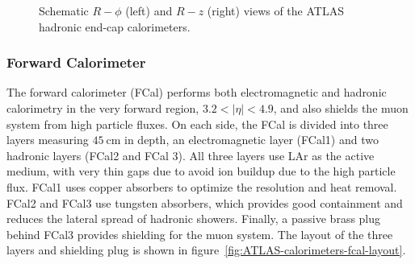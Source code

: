 \begin{figure}[htbp]
	\centering
	\caption{Schematic $R-\phi$ (left) and $R-z$ (right) views of the ATLAS hadronic end-cap calorimeters.}
	\label{fig:ATLAS-calorimeters-HEC-layout}
\end{figure}


\subsubsection{Forward Calorimeter}\label{sec:ATLAS-calorimeters-fcal}
The forward calorimeter (FCal) performs both electromagnetic and hadronic calorimetry in the very forward region, $3.2<|\eta|<4.9$, and also shields the muon system from high particle fluxes. On each side, the FCal is divided into three layers measuring $\SI{45}{\centi\meter}$ in depth, an electromagnetic layer (FCal1) and two hadronic layers (FCal2 and FCal 3). All three layers use LAr as the active medium, with very thin gaps due to avoid ion buildup due to the high particle flux. FCal1 uses copper absorbers to optimize the resolution and heat removal. FCal2 and FCal3 use tungsten absorbers, which provides good containment and reduces the lateral spread of hadronic showers. Finally, a passive brass plug behind FCal3 provides shielding for the muon system. The layout of the three layers and shielding plug is shown in figure~\ref{fig:ATLAS-calorimeters-fcal-layout}. 

